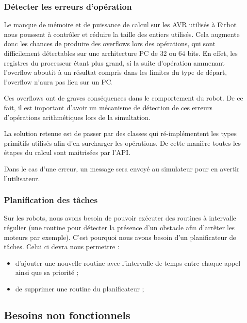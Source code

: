 
\subsubsection{Détecter les erreurs d'opération}

Le manque de mémoire et de puissance de calcul sur les AVR utilisés à Eirbot nous poussent à contrôler et réduire la taille des entiers utilisés. Cela augmente donc les chances de produire des overflows lors des opérations, qui sont difficilement détectables sur une architecture PC de 32 ou 64 bits. En effet, les registres du processeur étant plus grand, si la suite d'opération ammenant l'overflow aboutit à un résultat compris dans les limites du type de départ, l'overflow n'aura pas lieu sur un PC.

Ces overflows ont de graves conséquences dans le comportement du robot. De ce fait, il est important d'avoir un mécanisme de détection de ces erreurs d'opérations arithmétiques lors de la simultation.

La solution retenue est de passer par des classes qui ré-implémentent les types primitifs utilisés afin d'en surcharger les opérations. De cette manière toutes les étapes du calcul sont maitrisées par l'API.

Dans le cas d'une erreur, un message sera envoyé au simulateur pour en avertir l'utilisateur.

\subsubsection{Planification des tâches}

Sur les robots, nous avons besoin de pouvoir exécuter des routines à intervalle régulier (une routine pour détecter la présence d'un obstacle afin d'arrêter les moteurs par exemple). C'est pourquoi nous avons besoin d'un planificateur de tâches. Celui ci devra nous permettre :
\begin{itemize}
    \item d'ajouter une nouvelle routine avec l'intervalle de temps entre chaque appel ainsi que sa priorité ;
    \item de supprimer une routine du planificateur ;
\end{itemize}

\subsection{Besoins non fonctionnels}

